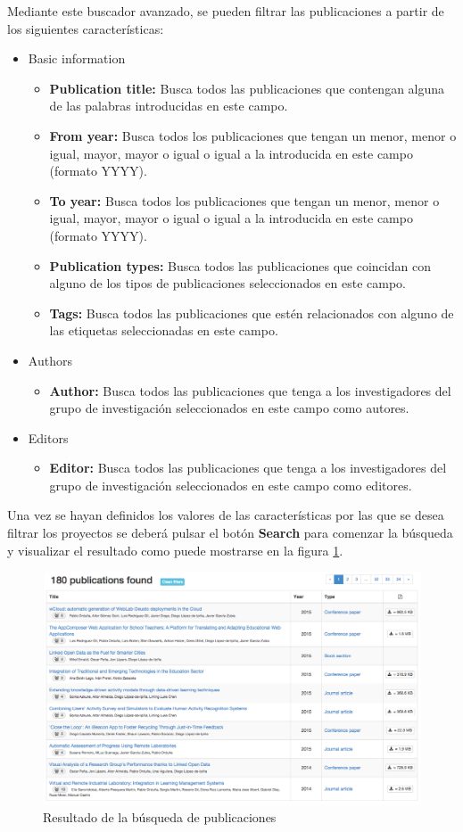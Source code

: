 Mediante este buscador avanzado, se pueden filtrar las publicaciones a partir de los siguientes características:

\begin{itemize}
	\item Basic information
	\begin{itemize}
		\item \textbf{Publication title:} Busca todos las publicaciones que contengan alguna de las palabras introducidas en este campo.
		\item \textbf{From year:} Busca todos los publicaciones que tengan un menor, menor o igual, mayor, mayor o igual o igual a la introducida en este campo (formato YYYY).
		\item \textbf{To year:} Busca todos los publicaciones que tengan un menor, menor o igual, mayor, mayor o igual o igual a la introducida en este campo (formato YYYY).
		\item \textbf{Publication types:} Busca todos las publicaciones que coincidan con alguno de los tipos de publicaciones seleccionados en este campo.
		\item \textbf{Tags:} Busca todos las publicaciones que estén relacionados con alguno de las etiquetas seleccionadas en este campo.
	\end{itemize}
	\item Authors
	\begin{itemize}
		\item \textbf{Author:} Busca todos las publicaciones que tenga a los investigadores del grupo de investigación seleccionados en este campo como autores.
	\end{itemize}
	\item Editors
	\begin{itemize}
		\item \textbf{Editor:} Busca todos las publicaciones que tenga a los investigadores del grupo de investigación seleccionados en este campo como editores.
	\end{itemize}
\end{itemize}

Una vez se hayan definidos los valores de las características por las que se desea filtrar los proyectos se deberá pulsar el botón \textbf{Search} para comenzar la búsqueda y visualizar el resultado como puede mostrarse en la figura \ref{fig:publications_search_result}.

\begin{figure}[!htbp]
	\centering
	\includegraphics[scale=0.31]{fig/publications_search_result}
	\caption{Resultado de la búsqueda de publicaciones}
	\label{fig:publications_search_result}
\end{figure}
